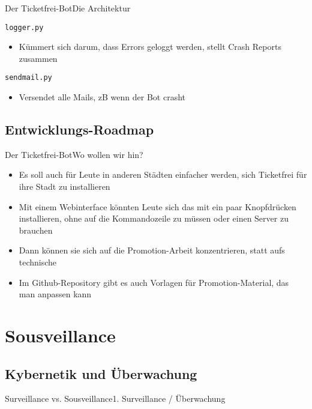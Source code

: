\documentclass[10pt]{beamer}
\begin{document}
{\begin{frame}{Der Ticketfrei-Bot}{Die Architektur}
\begin{block}{{\tt logger.py}}
  \begin{itemize}
    \item Kümmert sich darum, dass Errors geloggt werden, stellt Crash Reports zusammen
  \end{itemize}
\end{block}

\begin{block}{{\tt sendmail.py}}
  \begin{itemize}
    \item Versendet alle Mails, zB wenn der Bot crasht
  \end{itemize}
\end{block}

\end{frame}

\subsection{Entwicklungs-Roadmap}
\begin{frame}{Der Ticketfrei-Bot}{Wo wollen wir hin?}

\begin{itemize}
  \item<1-> Es soll auch für Leute in anderen Städten einfacher werden, sich Ticketfrei für ihre Stadt zu installieren
  \item<1-> Mit einem Webinterface könnten Leute sich das mit ein paar Knopfdrücken installieren, ohne auf die Kommandozeile zu müssen oder einen Server zu brauchen
  \item<2-> Dann können sie sich auf die Promotion-Arbeit konzentrieren, statt aufs technische
  \item<2-> Im Github-Repository gibt es auch Vorlagen für Promotion-Material, das man anpassen kann
\end{itemize}


\end{frame}

\section{Sousveillance}
\subsection{Kybernetik und Überwachung}
\begin{frame}{Surveillance vs. Sousveillance}{1. Surveillance / Überwachung}


\end{frame}}
\end{document}
